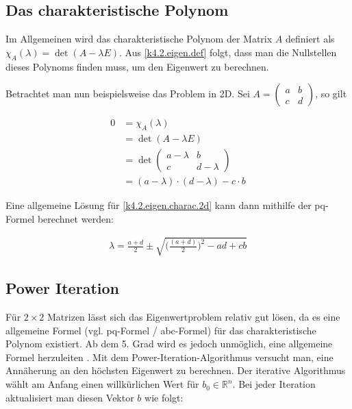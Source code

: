 \documentclass[]{dsadokumentation}
\begin{document}
\subsection{Das charakteristische Polynom}

Im Allgemeinen wird das charakteristische Polynom der Matrix $A$ definiert als $\chi_A (\lambda) = \det(A - \lambda E)$. Aus \cref{k4.2.eigen.def} folgt, dass man die Nullstellen dieses Polynoms finden muss, um den Eigenwert zu berechnen.

Betrachtet man nun beispielsweise das Problem in 2D. Sei $A = \begin{pmatrix}
    a & b \\
    c & d
  \end{pmatrix}$, so gilt

\begin{equation}
  \label{k4.2.eigen.charac.2d}
  \begin{aligned}
    0
     & = \chi_A (\lambda)                              \\
     & = \det(A - \lambda E)                           \\
     & = \det \begin{pmatrix}
                a - \lambda & b         \\
                c           & d-\lambda
              \end{pmatrix}                  \\
     & = (a - \lambda) \cdot (d - \lambda) - c \cdot b
  \end{aligned}
\end{equation}

Eine allgemeine Lösung für \cref{k4.2.eigen.charac.2d} kann dann mithilfe der pq-Formel berechnet werden:

\begin{equation}
  \begin{aligned}
    \lambda = \frac{a+d}{2} \pm \sqrt{\Big(\frac{(a+d)}{2}\Big)^2-ad+cb}
  \end{aligned}
\end{equation}


\subsection{Power Iteration}\label{k4.2.eigen.powerit}

Für $2 \times 2$ Matrizen lässt sich das Eigenwertproblem relativ gut lösen, da es eine allgemeine Formel (vgl. pq-Formel / abc-Formel) für das charakteristische Polynom existiert. Ab dem 5. Grad wird es jedoch unmöglich, eine allgemeine Formel herzuleiten \parencite{k4.2.ramond}. %
Mit dem Power-Iteration-Algorithmus versucht man, eine Annäherung an den höchsten Eigenwert zu berechnen. Der iterative Algorithmus wählt am Anfang einen willkürlichen Wert für $b_0 \in \mathbb{R}^n$. Bei jeder Iteration aktualisiert man diesen Vektor $b$ wie folgt:
\end{document}

